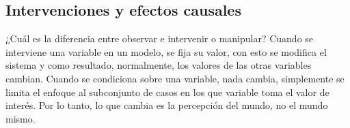 





\subsection{Intervenciones y efectos causales}

¿Cuál es la diferencia entre observar e intervenir o
manipular? 
Cuando se interviene una variable en un modelo, se fija su valor, con esto se modifica el sistema y como resultado, normalmente, los valores de las otras variables cambian.
Cuando se condiciona sobre una variable, nada cambia, simplemente se limita el enfoque al subconjunto de casos en los que variable toma el valor de interés. 
Por lo tanto, lo que cambia es la percepción del mundo, no el mundo mismo.

